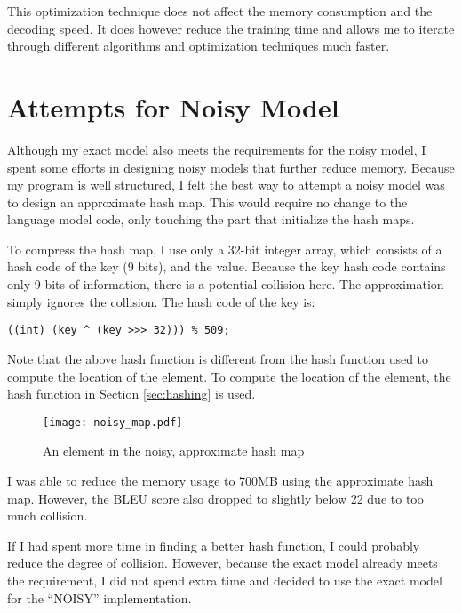 \documentclass[12pt]{article}   %
\begin{document}
This optimization technique does not affect the memory consumption and the decoding speed. It does however reduce the training time and allows me to iterate through different algorithms and optimization techniques much faster.

\section{Attempts for Noisy Model}
\label{sec:noisy}
Although my exact model also meets the requirements for the noisy model, I spent some efforts in designing noisy models that further reduce memory. Because my program is well structured, I felt the best way to attempt a noisy model was to design an approximate hash map. This would require no change to the language model code, only touching the part that initialize the hash maps.

To compress the hash map, I use only a 32-bit integer array, which consists of a hash code of the key (9 bits), and the value. Because the key hash code contains only 9 bits of information, there is a potential collision here. The approximation simply ignores the collision. The hash code of the key is:
\begin{verbatim}
((int) (key ^ (key >>> 32))) % 509;
\end{verbatim}

Note that the above hash function is different from the hash function used to compute the location of the element. To compute the location of the element, the hash function in Section \ref{sec:hashing} is used.

\begin{figure}[h*]
	\centering
	\texttt{[image: noisy\_map.pdf]}
	\caption{An element in the noisy, approximate hash map}
	\label{fig:noisy_map}
\end{figure}

I was able to reduce the memory usage to 700MB using the approximate hash map. However, the BLEU score also dropped to slightly below 22 due to too much collision.

If I had spent more time in finding a better hash function, I could probably reduce the degree of collision. However, because the exact model already meets the requirement, I did not spend extra time and decided to use the exact model for the ``NOISY'' implementation.
\end{document}
